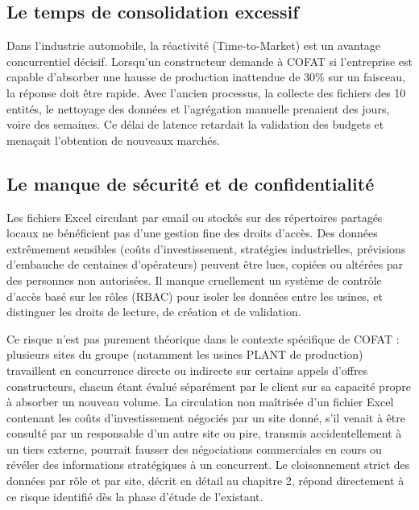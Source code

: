 \subsection{Le temps de consolidation excessif}
Dans l'industrie automobile, la réactivité (Time-to-Market) est un avantage concurrentiel décisif. Lorsqu'un constructeur demande à COFAT si l'entreprise est capable d'absorber une hausse de production inattendue de 30\% sur un faisceau, la réponse doit être rapide. Avec l'ancien processus, la collecte des fichiers des 10 entités, le nettoyage des données et l'agrégation manuelle prenaient des jours, voire des semaines. Ce délai de latence retardait la validation des budgets et menaçait l'obtention de nouveaux marchés.

\subsection{Le manque de sécurité et de confidentialité}
Les fichiers Excel circulant par email ou stockés sur des répertoires partagés locaux ne bénéficient pas d'une gestion fine des droits d'accès. Des données extrêmement sensibles (coûts d'investissement, stratégies industrielles, prévisions d'embauche de centaines d'opérateurs) peuvent être lues, copiées ou altérées par des personnes non autorisées. Il manque cruellement un système de contrôle d'accès basé sur les rôles (RBAC) pour isoler les données entre les usines, et distinguer les droits de lecture, de création et de validation.

Ce risque n'est pas purement théorique dans le contexte spécifique de COFAT : plusieurs sites du groupe (notamment les usines PLANT de production) travaillent en concurrence directe ou indirecte sur certains appels d'offres constructeurs, chacun étant évalué séparément par le client sur sa capacité propre à absorber un nouveau volume. La circulation non maîtrisée d'un fichier Excel contenant les coûts d'investissement négociés par un site donné, s'il venait à être consulté par un responsable d'un autre site ou pire, transmis accidentellement à un tiers externe, pourrait fausser des négociations commerciales en cours ou révéler des informations stratégiques à un concurrent. Le cloisonnement strict des données par rôle et par site, décrit en détail au chapitre 2, répond directement à ce risque identifié dès la phase d'étude de l'existant.

